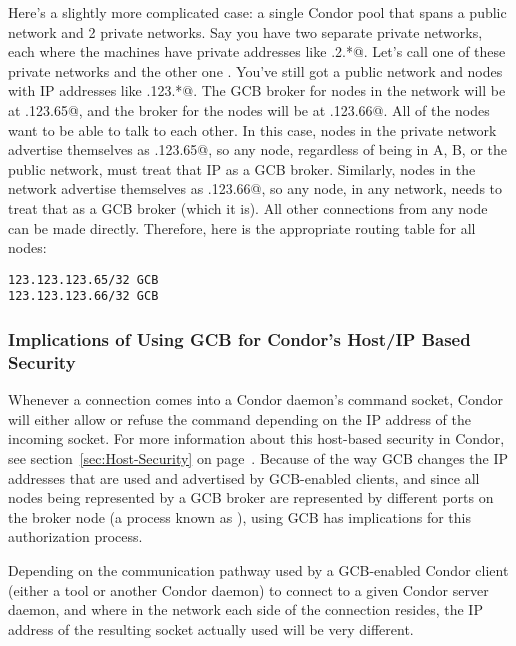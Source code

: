 Here's a slightly more complicated case: a single Condor pool that
spans a public network and 2 private networks.
Say you have two separate private networks, each where the machines
have private addresses like .2.*@.
Let's call one of these private networks \verb@A@ and the other one
\verb@B@. 
You've still got a public network and nodes with IP addresses like
.123.*@.
The GCB broker for nodes in the \verb@A@ network will be at
.123.65@, and the broker for the \verb@B@ nodes will be
at .123.66@.
All of the nodes want to be able to talk to each other.
In this case, nodes in the \verb@A@ private network advertise
themselves as .123.65@, so any node, regardless of being
in A, B, or the public network, must treat that IP as a GCB broker.
Similarly, nodes in the \verb@B@ network advertise themselves as
.123.66@, so any node, in any network, needs to treat
that as a GCB broker (which it is).
All other connections from any node can be made directly.
Therefore, here is the appropriate routing table for all nodes:

\begin{verbatim}
123.123.123.65/32 GCB
123.123.123.66/32 GCB
\end{verbatim}


\subsubsection{\label{sec:GCB-host-security-implications}Implications
of Using GCB for Condor's Host/IP Based Security} 

Whenever a connection comes into a Condor daemon's command socket,
Condor will either allow or refuse the command depending on the IP
address of the incoming socket.
For more information about this host-based security in Condor, see
section~\ref{sec:Host-Security} on page~\pageref{sec:Host-Security}.
Because of the way GCB changes the IP addresses that are used and
advertised by GCB-enabled clients, and since all nodes being
represented by a GCB broker are represented by different ports on the
broker node (a process known as ), using GCB has
implications for this authorization process.

Depending on the communication pathway used by a GCB-enabled Condor
client (either a tool or another Condor daemon) to connect to a given
Condor server daemon, and where in the network each side of the
connection resides, the IP address of the resulting socket actually
used will be very different.

